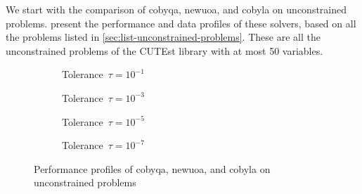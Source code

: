 We start with the comparison of \gls{cobyqa}, \gls{newuoa}, and \gls{cobyla} on unconstrained problems.
 present the performance and data profiles of these solvers, based on all the problems listed in \cref{sec:list-unconstrained-problems}.
These are all the unconstrained problems of the CUTEst library with at most \num{50} variables.

\begin{figure}[ht]
    \centering
    \begin{subfigure}[b]{0.49\textwidth}
        \centering
        \caption{Tolerance~$\tau = 10^{-1}$}
    \end{subfigure}
    \hfill
    \begin{subfigure}[b]{0.49\textwidth}
        \centering
        \caption{Tolerance~$\tau = 10^{-3}$}
    \end{subfigure}
    \begin{subfigure}[b]{0.49\textwidth}
        \centering
        \caption{Tolerance~$\tau = 10^{-5}$}
    \end{subfigure}
    \hfill
    \begin{subfigure}[b]{0.49\textwidth}
        \centering
        \caption{Tolerance~$\tau = 10^{-7}$}
    \end{subfigure}
    \caption[Performance profiles on unconstrained problems]{Performance profiles of \gls{cobyqa}, \gls{newuoa}, and \gls{cobyla} on unconstrained problems}
    \label{fig:perf-unconstrained-problems}
\end{figure}


